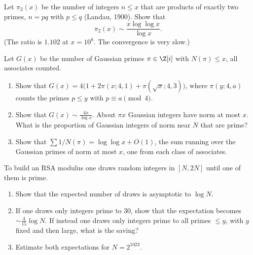 \begin{exercise}[$\star\star\star$]\label{ex:semiprimes}
Let $\pi_2(x)$ be the number of integers $n\le x$ that are products of exactly two primes, $n=pq$ with $p\le q$ (Landau, 1900). Show that
\[
\pi_2(x)\sim\frac{x\log\log x}{\log x}.
\]
(The ratio is $1.102$ at $x=10^8$. The convergence is very slow.)
\end{exercise}

\begin{exercise}[$\star\star$]\label{pb:gaussprimes}
Let $G(x)$ be the number of Gaussian primes $\pi\in\Z[i]$ with $N(\pi)\le x$, all associates counted.
\begin{enumerate}[label=(\alph*)]
\item Show that $G(x)=4\bigl(1+2\pi(x;4,1)+\pi(\sqrt x;4,3)\bigr)$, where $\pi(y;4,a)$ counts the primes $p\le y$ with $p\equiv a\pmod4$.
\item Show that $G(x)\sim\frac{4x}{\log x}$. About $\pi x$ Gaussian integers have norm at most $x$. What is the proportion of Gaussian integers of norm near $N$ that are prime?
\item Show that $\sum 1/N(\pi)=\log\log x+O(1)$, the sum running over the Gaussian primes of norm at most $x$, one from each class of associates.
\end{enumerate}
\end{exercise}

\begin{exercise}[$\star$]\label{pb:findprime}
To build an RSA modulus one draws random integers in $[N,2N]$ until one of them is prime.
\begin{enumerate}[label=(\alph*)]
\item Show that the expected number of draws is asymptotic to $\log N$.
\item If one draws only integers prime to $30$, show that the expectation becomes $\sim\frac4{15}\log N$. If instead one draws only integers prime to all primes $\le y$, with $y$ fixed and then large, what is the saving?
\item Estimate both expectations for $N=2^{1023}$.
\end{enumerate}
\end{exercise}

